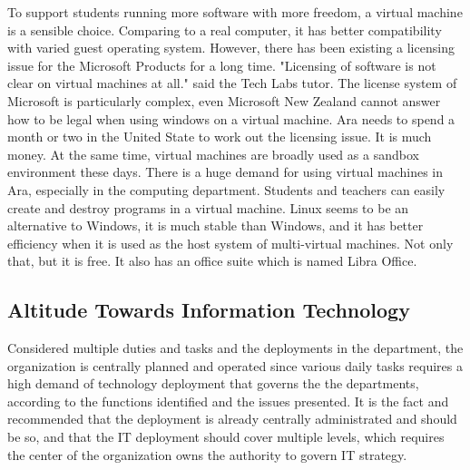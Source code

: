 To support students running more software with more freedom, a virtual machine is a sensible choice. Comparing to a real computer, it has better compatibility with varied guest operating system. However, there has been existing a licensing issue for the Microsoft Products for a long time. "Licensing of software is not clear on virtual machines at all." said the Tech Labs tutor. The license system of Microsoft is particularly complex, even Microsoft New Zealand cannot answer how to be legal when using windows on a virtual machine. Ara needs to spend a month or two in the United State to work out the licensing issue. It is much money. At the same time, virtual machines are broadly used as a sandbox environment these days. There is a huge demand for using virtual machines in Ara, especially in the computing department. Students and teachers can easily create and destroy programs in a virtual machine. Linux seems to be an alternative to Windows, it is much stable than Windows, and it has better efficiency when it is used as the host system of multi-virtual machines. Not only that, but it is free. It also has an office suite which is named Libra Office.


\subsection{Altitude Towards Information Technology}
Considered multiple duties and tasks and the deployments in the department, the organization is centrally planned and operated since various daily tasks requires a high demand of technology deployment that governs the the departments, according to the functions identified and the issues presented. It is the fact and recommended that the deployment is already centrally administrated and should be so, and that the IT deployment should cover multiple levels, which requires the center of the organization owns the authority to govern IT strategy.